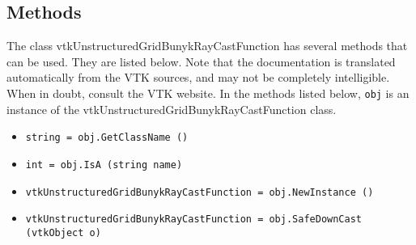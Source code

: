 \subsection{Methods}

The class vtkUnstructuredGridBunykRayCastFunction has several methods that can be used.
  They are listed below.
Note that the documentation is translated automatically from the VTK sources,
and may not be completely intelligible.  When in doubt, consult the VTK website.
In the methods listed below, \verb|obj| is an instance of the vtkUnstructuredGridBunykRayCastFunction class.
\begin{itemize}
\item  \verb|string = obj.GetClassName ()|

\item  \verb|int = obj.IsA (string name)|

\item  \verb|vtkUnstructuredGridBunykRayCastFunction = obj.NewInstance ()|

\item  \verb|vtkUnstructuredGridBunykRayCastFunction = obj.SafeDownCast (vtkObject o)|

\end{itemize}
